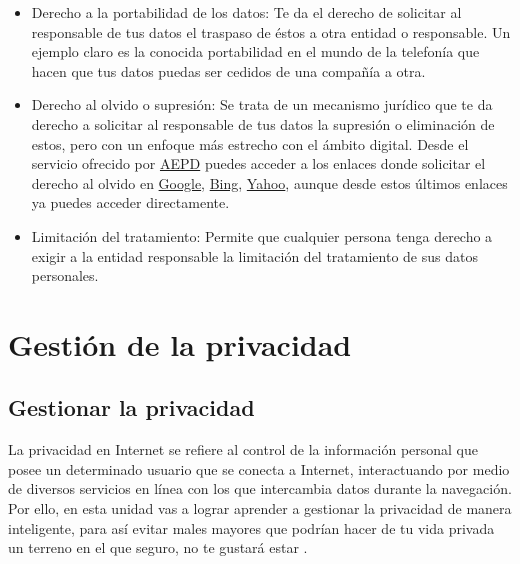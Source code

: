 \documentclass[
  spanish,
  a4paper,
  openany]{book}
\begin{document}
\begin{itemize}
\item
  Derecho a la portabilidad de los datos: Te da el derecho de solicitar al responsable de tus datos el traspaso de éstos a otra entidad o responsable. Un ejemplo claro es la conocida portabilidad en el mundo de la telefonía que hacen que tus datos puedas ser cedidos de una compañía a otra.
\item
  Derecho al olvido o supresión: Se trata de un mecanismo jurídico que te da derecho a solicitar al responsable de tus datos la supresión o eliminación de estos, pero con un enfoque más estrecho con el ámbito digital. Desde el servicio ofrecido por \href{https://www.aepd.es/es/areas-de-actuacion/internet-y-redes-sociales/derecho-al-olvido}{AEPD} puedes acceder a los enlaces donde solicitar el derecho al olvido en \href{https://www.google.com/webmasters/tools/legal-removal-request?complaint_type=rtbf\&visit_id=637490694757326412-3626204680\&hl=es\&rd=1}{Google}, \href{https://www.bing.com/webmaster/tools/eu-privacy-request}{Bing}, \href{https://es.ayuda.yahoo.com/kb/Solicitud-para-bloquear-resultados-de-b\%C3\%BAsqueda-en-Yahoo-Search-Recursos-para-Residentes-Europeos-sln28252.html?guccounter=1\&guce_referrer=aHR0cHM6Ly93d3cuYWVwZC5lcy8\&guce_referrer_sig=AQAAAIRquvv_VPnIiAOniwOvZi_iVodzBg6yn2C0sGApxESxJWBR6RMqeNq89qO01lmI0UdIKSr3ivLxST8cTDrgIMQRF9FIda60jZQ16f8q85f-eqLvvviA02B_fephtV40QIGV7aQ8Uw0M7f_poDUONOrmeKQzbahKvnuKZCoBDBFQ}{Yahoo}, aunque desde estos últimos enlaces ya puedes acceder directamente.
\item
  Limitación del tratamiento: Permite que cualquier persona tenga derecho a exigir a la entidad responsable la limitación del tratamiento de sus datos personales.
\end{itemize}

\hypertarget{gestiuxf3n-de-la-privacidad}{%
\chapter{Gestión de la privacidad}\label{gestiuxf3n-de-la-privacidad}}

\hypertarget{gestionar-la-privacidad}{%
\section{Gestionar la privacidad}\label{gestionar-la-privacidad}}

La privacidad en Internet se refiere al control de la información personal que posee un determinado usuario que se conecta a Internet, interactuando por medio de diversos servicios en línea con los que intercambia datos durante la navegación. Por ello, en esta unidad vas a lograr aprender a gestionar la privacidad de manera inteligente, para así evitar males mayores que podrían hacer de tu vida privada un terreno en el que seguro, no te gustará estar \citep{WIKI-privacidad}.
\end{document}
